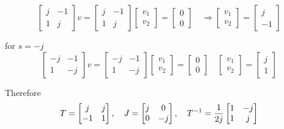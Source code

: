\documentclass[12pt,a4paper]{article}
\begin{document}
\[
\begin{bmatrix}
	j & -1 \\ 1 & j
\end{bmatrix} v = \begin{bmatrix}
	j & -1 \\ 1 & j
\end{bmatrix}\begin{bmatrix}
	v_1 \\ v_2
\end{bmatrix} = \begin{bmatrix}
	0 \\ 0
\end{bmatrix} \quad \Rightarrow \begin{bmatrix}
	v_1 \\ v_2 
\end{bmatrix} = \begin{bmatrix}
	j \\ -1
\end{bmatrix}
\]

for $s = -j$
\[
\begin{bmatrix}
	-j & -1 \\ 1& -j 
\end{bmatrix} v = \begin{bmatrix}
	-j & -1 \\ 1& -j 
\end{bmatrix}\begin{bmatrix}
	v_1 \\ v_2
\end{bmatrix} = \begin{bmatrix}
	0 \\ 0
\end{bmatrix} \quad \begin{bmatrix}
	v_1 \\ v_2
\end{bmatrix} = \begin{bmatrix}
	j \\ 1
\end{bmatrix}
\]

Therefore 
\[
T = \begin{bmatrix}
	j & j \\ -1 & 1
\end{bmatrix}, \quad J = \begin{bmatrix}
	j & 0 \\ 0 & -j
\end{bmatrix}, \quad T^{-1} = {1\over 2j} \begin{bmatrix}
	1 & -j \\ 1 & j
\end{bmatrix}
\]
\end{document}
